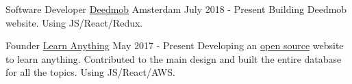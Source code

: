 
\begin{cventries}

  \cventry
    {Software Developer} %
    {\href{https://www.deedmob.com}{Deedmob}} %
    {Amsterdam} %
    {July 2018 - Present} %
    {
      {Building Deedmob website. Using JS/React/Redux.}
    }

  \cventry
    {Founder} %
    {\href{https://learn-anything.xyz}{Learn Anything}} %
    {} %
    {May 2017 - Present} %
    {
      {Developing an \href{https://github.com/learn-anything/learn-anything}{open source} website to learn anything. Contributed to the main design and built the entire database for all the topics. Using JS/React/AWS.}
    }

\end{cventries}
